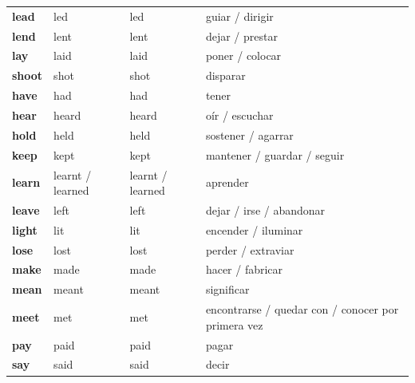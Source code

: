 \documentclass[11pt,a4paper]{article}
\begin{document}
\begin{longtable}{>{\bfseries}p{2.8cm}p{3.5cm}p{3.7cm}>{\raggedright\arraybackslash}p{6.6cm}}
\textcolor{verdeO}{lead} & \textcolor{verdeO}{led} & \textcolor{verdeO}{led} & \textcolor{verdeO}{guiar / dirigir}\\
\textcolor{verdeO}{lend} & \textcolor{verdeO}{lent} & \textcolor{verdeO}{lent} & \textcolor{verdeO}{dejar / prestar}\\
\textcolor{verdeO}{lay} & \textcolor{verdeO}{laid} & \textcolor{verdeO}{laid} & \textcolor{verdeO}{poner / colocar}\\
\textcolor{verdeO}{shoot} & \textcolor{verdeO}{shot} & \textcolor{verdeO}{shot} & \textcolor{verdeO}{disparar}\\
\textcolor{verdeO}{have} & \textcolor{verdeO}{had} & \textcolor{verdeO}{had} & \textcolor{verdeO}{tener}\\
\textcolor{verdeO}{hear} & \textcolor{verdeO}{heard} & \textcolor{verdeO}{heard} & \textcolor{verdeO}{oír / escuchar}\\
\textcolor{verdeO}{hold} & \textcolor{verdeO}{held} & \textcolor{verdeO}{held} & \textcolor{verdeO}{sostener / agarrar}\\
\textcolor{verdeO}{keep} & \textcolor{verdeO}{kept} & \textcolor{verdeO}{kept} & \textcolor{verdeO}{mantener / guardar / seguir}\\
\textcolor{verdeO}{learn} & \textcolor{verdeO}{learnt / learned} & \textcolor{verdeO}{learnt / learned} & \textcolor{verdeO}{aprender}\\
\textcolor{verdeO}{leave} & \textcolor{verdeO}{left} & \textcolor{verdeO}{left} & \textcolor{verdeO}{dejar / irse / abandonar}\\
\textcolor{verdeO}{light} & \textcolor{verdeO}{lit} & \textcolor{verdeO}{lit} & \textcolor{verdeO}{encender / iluminar}\\
\textcolor{verdeO}{lose} & \textcolor{verdeO}{lost} & \textcolor{verdeO}{lost} & \textcolor{verdeO}{perder / extraviar}\\
\textcolor{verdeO}{make} & \textcolor{verdeO}{made} & \textcolor{verdeO}{made} & \textcolor{verdeO}{hacer / fabricar}\\
\textcolor{verdeO}{mean} & \textcolor{verdeO}{meant} & \textcolor{verdeO}{meant} & \textcolor{verdeO}{significar}\\
\textcolor{verdeO}{meet} & \textcolor{verdeO}{met} & \textcolor{verdeO}{met} & \textcolor{verdeO}{encontrarse / quedar con / conocer por primera vez}\\
\textcolor{verdeO}{pay} & \textcolor{verdeO}{paid} & \textcolor{verdeO}{paid} & \textcolor{verdeO}{pagar}\\
\textcolor{verdeO}{say} & \textcolor{verdeO}{said} & \textcolor{verdeO}{said} & \textcolor{verdeO}{decir}\\

\end{longtable}
\end{document}
